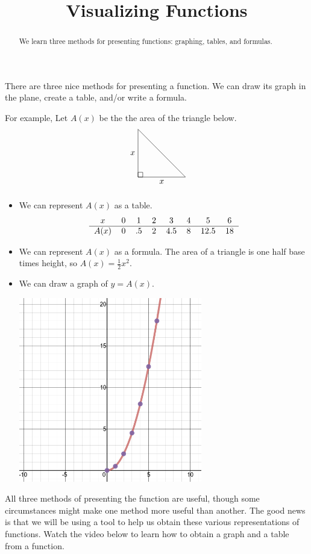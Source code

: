 \documentclass{ximera}
\title{Visualizing Functions}
\begin{document}
\begin{abstract}
We learn three methods for presenting functions: graphing, tables, and formulas.
\end{abstract}
\maketitle

There are three nice methods for presenting a function. We can draw its graph in the plane, create a table, and/or write a formula.

For example, Let $A(x)$ be the the area of the triangle below.
\[
\begin{tikzpicture}
\draw (0,0) --node[below]{$x$} (2,0) -- (0,2) --node[left]{$x$} (0,0) rectangle (.2,.2);
\end{tikzpicture}
\]
\begin{itemize}
\item We can represent $A(x)$ as a table.
\[
\begin{tabular}{cccccccc}
$x$ & $0$ & $1$ & $2$ & $3$ & $4$ & $5$ & $6$\\ \hline
$A(x)$ & $0$ & $.5$ & $2$ & $4.5$ & $8$ & $12.5$ & $18$
\end{tabular}
\]
\item
We can represent $A(x)$ as a formula. The area of a triangle is one half base times height, so $A(x)=\frac{1}{2}x^2$.
\item We can draw a graph of $y=A(x)$.
\begin{image}
\includegraphics[width=8cm]{IntroToFunctions/Functions/TriangleArea.png}
\end{image}
\end{itemize}

All three methods of presenting the function are useful, though some circumstances might make one method more useful than another. The good news is that we will be using a tool to help us obtain these various representations of functions. Watch the video below to learn how to obtain a graph and a table from a function.
\end{document}

